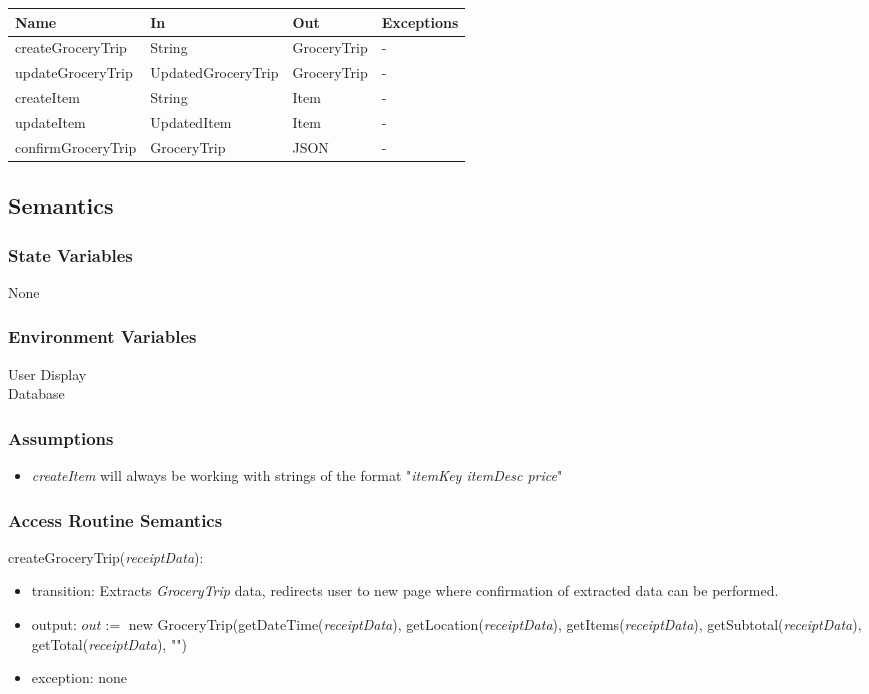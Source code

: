 \documentclass[12pt, titlepage]{article}
\begin{document}
\begin{center}
  \begin{tabular}{p{5cm} p{4cm} p{3cm} p{4cm}}
  \hline
  \textbf{Name} & \textbf{In} & \textbf{Out} & \textbf{Exceptions} \\
  \hline
  createGroceryTrip & String & GroceryTrip & -\\
  updateGroceryTrip & UpdatedGroceryTrip & GroceryTrip & -\\
  createItem & String & Item & -\\
  updateItem & UpdatedItem & Item & -\\
  confirmGroceryTrip & GroceryTrip & JSON & -\\
  \hline
  \end{tabular}
\end{center}

\subsection{Semantics}

\subsubsection{State Variables}

None

\subsubsection{Environment Variables}

User Display\\
Database

\subsubsection{Assumptions}
\begin{itemize}
  \item \textit{createItem} will always be working with strings of the format "\textit{itemKey itemDesc price}"
\end{itemize}

\subsubsection{Access Routine Semantics}

\noindent createGroceryTrip(\textit{receiptData}):
\begin{itemize}
  \item transition: Extracts \textit{GroceryTrip} data, redirects user to new page where confirmation
of extracted data can be performed.
  \item output: $out :=$ new GroceryTrip(getDateTime(\textit{receiptData}), getLocation(\textit{receiptData}),
                        getItems(\textit{receiptData}), getSubtotal(\textit{receiptData}), getTotal(\textit{receiptData}), "")
  \item exception: none
\end{itemize}
\end{document}
